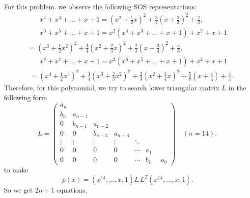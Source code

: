 \documentclass[runningheads]{llncs}
\begin{document}
{For this problem. we observe the following SOS representations:
\begin{align*}
&\phantom{xxx}x^4+x^3+\ldots+x+1=
(x^2+\frac{1}{2}x)^2+\frac{3}{4}(x+\frac{2}{3})^2+\frac{2}{3},\\[3pt]
&\phantom{xxx}x^6+x^5+\ldots+x+1=x^2(x^4+x^3+\ldots+x+1)+x^2+x+1\\[3pt]
&
=(x^3+\frac{1}{2}x^2)^2+\frac{3}{4}(x^2+\frac{2}{3}x)^2+\frac{2}{3}(x+\frac{3}{4})^2+\frac{5}{8},\\[3pt]
&\phantom{xxx}x^8+x^7+\ldots+x+1=x^2(x^6+x^5+\ldots+x+1)+x^2+x+1\\[3pt]
&\;=(x^4+\frac{1}{2}x^3)^2+\frac{3}{4}(x^3+\frac{2}{3}x^2)^2+\frac{2}{3}(x^2+\frac{3}{4}x)^2
+\frac{5}{8}(x+\frac{4}{5})+\frac{3}{5}.
\end{align*}
Therefore, for this polynomial, we try to search lower triangular matrix $L$ in the following form
\begin{equation}
L=\left(\begin{array}{cccccccc}
a_n&\\
b_n&a_{n-1}&\\
0&b_{n-1}&a_{n-2}&\\
0&0&b_{n-2}&a_{n-3}&\\
\vdots&\vdots&\vdots&\vdots&\ddots&\\
0&0&0&0&\cdots&a_1&\\
0&0&0&0&\cdots&b_1&\;\,a_0
\end{array}\right)\quad (n=14),
\label{eqs1-3}
\end{equation}
to make 
$$
p(x)=(x^{14},\ldots,x,1)L\, L^T(x^{14},\ldots,x,1).
$$
So we get $2n+1$ equations,   

}
\end{document}
